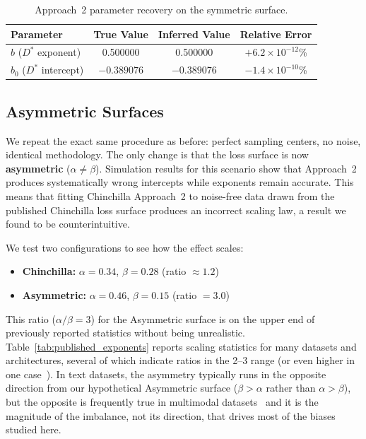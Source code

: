 \documentclass[11pt]{article}
\begin{document}
\begin{table}[ht]
    \centering
    \begin{tabular}{lccc}
        \toprule
        Parameter & True Value & Inferred Value & Relative Error \\
        \midrule
        $b$ ($D^*$ exponent) & 0.500000 & 0.500000 & $+6.2 \times 10^{-12}$\% \\
        $b_0$ ($D^*$ intercept) & $-0.389076$ & $-0.389076$ & $-1.4 \times 10^{-10}$\% \\
        \bottomrule
    \end{tabular}
    \caption{Approach~2 parameter recovery on the symmetric surface.}
    \label{tab:happy_path}
\end{table}

\subsection{Asymmetric Surfaces}
\label{sec:asymmetric}

We repeat the exact same procedure as before: perfect sampling centers, no
noise, identical methodology. The only change is that the loss surface is now
\textbf{asymmetric} ($\alpha \neq \beta$).
Simulation results for this scenario show that Approach~2 produces
systematically wrong intercepts while exponents remain accurate. This means
that fitting Chinchilla Approach~2 to noise-free data drawn from the published
Chinchilla loss surface produces an incorrect scaling law, a result we found
to be counterintuitive.

We test two configurations to see how the effect scales:
\begin{itemize}
    \item \textbf{Chinchilla:} $\alpha = 0.34$, $\beta = 0.28$ (ratio $\approx 1.2$)
    \item \textbf{Asymmetric:} $\alpha = 0.46$, $\beta = 0.15$ (ratio $= 3.0$)
\end{itemize}

This ratio ($\alpha/\beta = 3$) for the Asymmetric surface is on the upper end
of previously reported statistics without being unrealistic.
Table~\ref{tab:published_exponents} reports scaling statistics for many datasets
and architectures, several of which indicate ratios in the 2--3 range (or even
higher in one case~\citep{protein_plm_scaling}). In text datasets, the asymmetry
typically runs in the opposite direction from our hypothetical Asymmetric surface
($\beta > \alpha$ rather than $\alpha > \beta$), but the opposite is frequently
true in multimodal datasets~\citep{beyond_language_modeling} and it is the magnitude of the imbalance, not its
direction, that drives most of the biases studied here.
\end{document}
